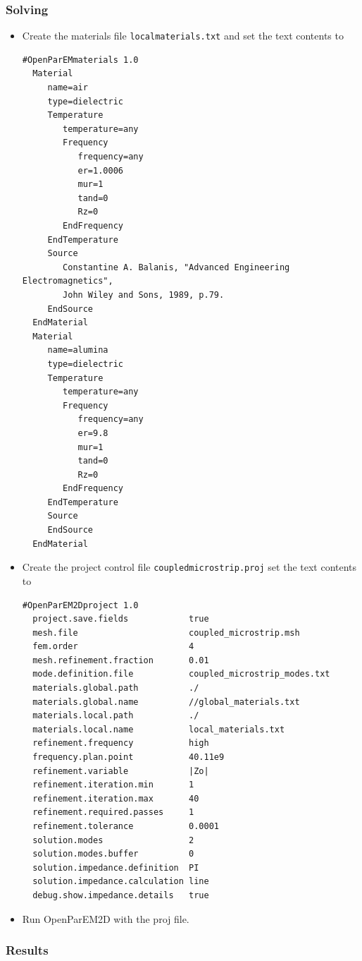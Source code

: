 \documentclass[titlepage]{article}
\renewcommand\_{\textunderscore\linebreak[1]}
\begin{document}
\subsubsection{Solving}

\begin{itemize}
\item Create the materials file \texttt{local\_materials.txt} and set the text contents to
\begin{Verbatim}[fontsize=\small]
  #OpenParEMmaterials 1.0
  Material
     name=air
     type=dielectric
     Temperature
        temperature=any
        Frequency
           frequency=any
           er=1.0006
           mur=1
           tand=0
           Rz=0
        EndFrequency
     EndTemperature
     Source
        Constantine A. Balanis, "Advanced Engineering Electromagnetics",
        John Wiley and Sons, 1989, p.79.
     EndSource
  EndMaterial
  Material
     name=alumina
     type=dielectric
     Temperature
        temperature=any
        Frequency
           frequency=any
           er=9.8
           mur=1
           tand=0
           Rz=0
        EndFrequency
     EndTemperature
     Source
     EndSource
  EndMaterial
\end{Verbatim}
\item Create the project control file \texttt{coupled\_microstrip.proj} set the text contents to
\begin{Verbatim}[fontsize=\small]
  #OpenParEM2Dproject 1.0
  project.save.fields            true
  mesh.file                      coupled_microstrip.msh
  fem.order                      4
  mesh.refinement.fraction       0.01
  mode.definition.file           coupled_microstrip_modes.txt
  materials.global.path          ./
  materials.global.name          //global_materials.txt
  materials.local.path           ./
  materials.local.name           local_materials.txt
  refinement.frequency           high
  frequency.plan.point           40.11e9
  refinement.variable            |Zo|
  refinement.iteration.min       1
  refinement.iteration.max       40
  refinement.required.passes     1
  refinement.tolerance           0.0001
  solution.modes                 2
  solution.modes.buffer          0
  solution.impedance.definition  PI
  solution.impedance.calculation line
  debug.show.impedance.details   true
\end{Verbatim}
\item Run OpenParEM2D with the proj file.
\end{itemize}

\subsubsection{Results}
\end{document}
